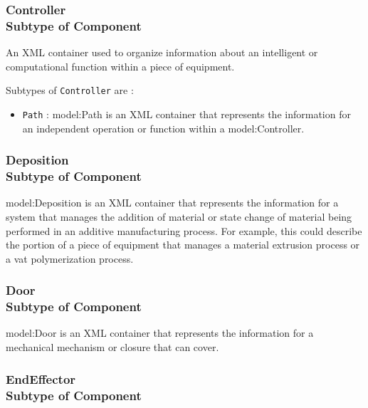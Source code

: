 \FloatBarrier
\subsubsection[Controller]{Controller \\ {\small Subtype of Component}}
  \label{type:Controller}

\FloatBarrier

An XML container used to organize information about an intelligent or computational function within a piece of equipment.

Subtypes of \texttt{Controller} are : 

\begin{itemize}

\item \texttt{Path} : {model:Path} is an XML container that represents the information for an independent operation or function within a {model:Controller}.

\end{itemize}

\FloatBarrier
\subsubsection[Deposition]{Deposition \\ {\small Subtype of Component}}
  \label{type:Deposition}

\FloatBarrier

{model:Deposition} is an XML container that represents the information for a system that manages the addition of material or state change of material being performed in an additive manufacturing process.  For example, this could describe the portion of a piece of equipment that manages a material extrusion process or a vat polymerization process.

\FloatBarrier
\subsubsection[Door]{Door \\ {\small Subtype of Component}}
  \label{type:Door}

\FloatBarrier

{model:Door} is an XML container that represents the information for a mechanical mechanism or closure that can cover.

\FloatBarrier
\subsubsection[EndEffector]{EndEffector \\ {\small Subtype of Component}}
  \label{type:EndEffector}

